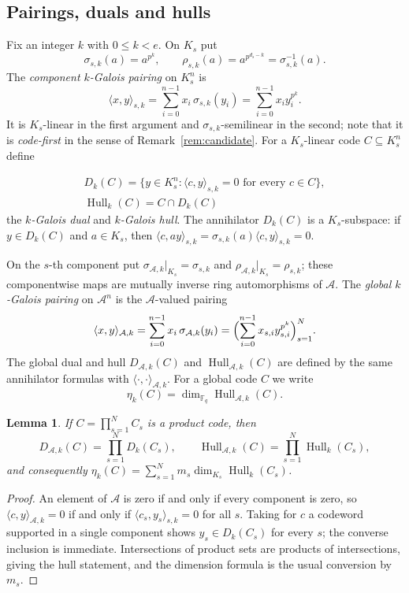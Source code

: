\documentclass[preprint,12pt,a4paper]{elsarticle}
\newcommand{\F}{\mathbb F}
\newcommand{\A}{\mathcal A}
\newcommand{\Hull}{\operatorname{Hull}}
\newcommand{\Dk}{D_k}
\newtheorem{lemma}[theorem]{Lemma}
\theoremstyle{definition}
\theoremstyle{remark}
\begin{document}
\subsection{Pairings, duals and hulls}\label{sec:pairing}

Fix an integer $k$ with $0\leq k<e$.  On $K_s$ put
\[
\sigma_{s,k}(a)=a^{p^k},\qquad
\rho_{s,k}(a)=a^{p^{d_s-k}}=\sigma_{s,k}^{-1}(a).
\]
The \emph{component $k$-Galois pairing} on $K_s^n$ is
\begin{equation}\label{eq:pairing}
\langle x,y\rangle_{s,k}
   =\sum_{i=0}^{n-1}x_i\,\sigma_{s,k}(y_i)
   =\sum_{i=0}^{n-1}x_i y_i^{p^k}.
\end{equation}
It is $K_s$-linear in the first argument and $\sigma_{s,k}$-semilinear in the
second; note that it is \emph{code-first} in the sense of
Remark~\ref{rem:candidate}.  For a $K_s$-linear code $C\subseteq K_s^n$ define

\[
\begin{gathered}
\Dk(C)=\{y\in K_s^n:\langle c,y\rangle_{s,k}=0
\text{ for every }c\in C\},\\
\Hull_k(C)=C\cap\Dk(C)
\end{gathered}
\]
the \emph{$k$-Galois dual} and \emph{$k$-Galois hull}.  The annihilator
$\Dk(C)$ is a $K_s$-subspace: if $y\in\Dk(C)$ and $a\in K_s$, then
$\langle c,ay\rangle_{s,k}=\sigma_{s,k}(a)\langle c,y\rangle_{s,k}=0$.

On the $s$-th component put $\sigma_{\A,k}|_{K_s}=\sigma_{s,k}$ and
$\rho_{\A,k}|_{K_s}=\rho_{s,k}$; these componentwise maps are mutually inverse
ring automorphisms of $\A$.  The \emph{global $k$-Galois pairing} on
$\A^n$ is the $\A$-valued pairing
\[
\langle x,y\rangle_{\A,k}
   =\sum_{i=0}^{n-1}x_i\,\sigma_{\A,k}(y_i)
   =\Bigl(\sum_{i=0}^{n-1}x_{s,i}y_{s,i}^{p^k}\Bigr)_{s=1}^{N}.
\]
The global dual and hull $D_{\A,k}(C)$ and $\Hull_{\A,k}(C)$ are defined by the
same annihilator formulas with $\langle\cdot,\cdot\rangle_{\A,k}$.  For a
global code $C$ we write
\[
\eta_k(C)=\dim_{\F_q}\Hull_{\A,k}(C).
\]

\begin{lemma}\label{lem:global-duality}
If $C=\prod_{s=1}^{N}C_s$ is a product code, then
\[
D_{\A,k}(C)=\prod_{s=1}^{N}\Dk(C_s),
\qquad
\Hull_{\A,k}(C)=\prod_{s=1}^{N}\Hull_k(C_s),
\]
and consequently
$\eta_k(C)=\sum_{s=1}^{N}m_s\dim_{K_s}\Hull_k(C_s)$.
\end{lemma}

\begin{proof}
An element of $\A$ is zero if and only if every component is zero, so
$\langle c,y\rangle_{\A,k}=0$ if and only if
$\langle c_s,y_s\rangle_{s,k}=0$ for all $s$.  Taking for $c$ a codeword
supported in a single component shows $y_s\in\Dk(C_s)$ for every $s$; the
converse inclusion is immediate.  Intersections of product sets are products of
intersections, giving the hull statement, and the dimension formula is the
usual conversion by $m_s$.
\end{proof}
\end{document}
